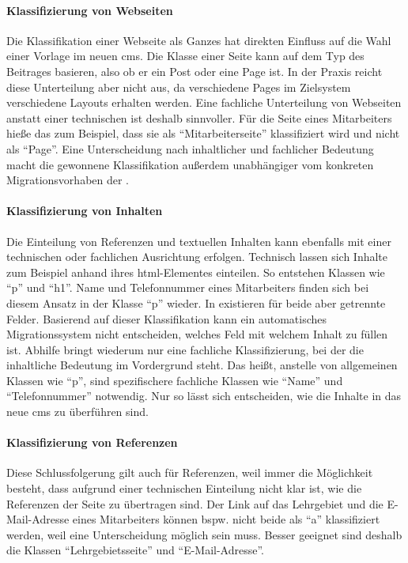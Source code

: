         \paragraph{Klassifizierung von Webseiten}
        Die Klassifikation einer Webseite als Ganzes hat direkten Einfluss auf die Wahl einer Vorlage im neuen \gls{cms}.
        Die Klasse einer Seite kann auf dem Typ des Beitrages basieren,
        also ob er ein Post oder eine Page ist.
        In der Praxis reicht diese Unterteilung aber nicht aus,
        da verschiedene {\wordpress} Pages im Zielsystem verschiedene Layouts erhalten werden.
        Eine fachliche Unterteilung von Webseiten anstatt einer technischen ist deshalb sinnvoller.
        Für die Seite eines Mitarbeiters hieße das zum Beispiel,
        dass sie als "`Mitarbeiterseite"' klassifiziert wird und nicht als "`Page"'.
        Eine Unterscheidung nach inhaltlicher und fachlicher Bedeutung macht die
        gewonnene Klassifikation außerdem unabhängiger vom konkreten
        Migrationsvorhaben der {\fernUni}.

        \paragraph{Klassifizierung von Inhalten}
        Die Einteilung von Referenzen und textuellen Inhalten kann ebenfalls
        mit einer technischen oder fachlichen Ausrichtung erfolgen.
        Technisch lassen sich Inhalte zum Beispiel anhand ihres \gls{html}-Elementes einteilen.
        So entstehen Klassen wie "`p"' und "`h1"'.
        Name und Telefonnummer eines Mitarbeiters finden sich bei diesem Ansatz in der Klasse "`p"' wieder.
        In {\imperia} existieren für beide aber getrennte Felder.
        Basierend auf dieser Klassifikation kann ein automatisches Migrationssystem
        nicht entscheiden, welches Feld mit welchem Inhalt zu füllen ist.
        Abhilfe bringt wiederum nur eine fachliche Klassifizierung,
        bei der die inhaltliche Bedeutung im Vordergrund steht.
        Das heißt, anstelle von allgemeinen Klassen wie "`p"',
        sind spezifischere fachliche Klassen wie
        "`Name"' und "`Telefonnummer"' notwendig.
        Nur so lässt sich entscheiden, wie die Inhalte in das neue \gls{cms}
        zu überführen sind.

        \paragraph{Klassifizierung von Referenzen}
        Diese Schlussfolgerung gilt auch für Referenzen,
        weil immer die Möglichkeit besteht,
        dass aufgrund einer technischen Einteilung nicht klar ist,
        wie die Referenzen der Seite zu übertragen sind.
        Der Link auf das Lehrgebiet und die E-Mail-Adresse eines Mitarbeiters
        können bspw. nicht beide als "`a"' klassifiziert werden,
        weil eine Unterscheidung möglich sein muss.
        Besser geeignet sind deshalb die Klassen "`Lehrgebietsseite"'
        und "`E-Mail-Adresse"'.

